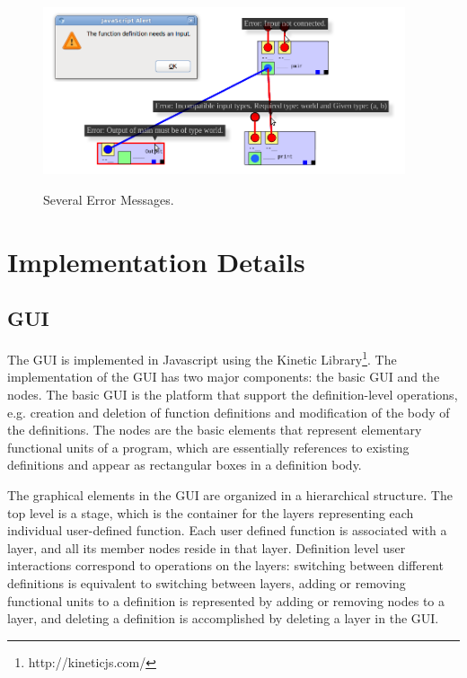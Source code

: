 \documentclass[12pt,UTF8,a4]{article}
\begin{document}
\begin{figure}[h!]
\center
\includegraphics[width=0.95\textwidth]{./images/error_displays_cropped.png} \\
\caption{Several Error Messages.}\label{fig:errors}
\end{figure}

\section{Implementation Details}
\subsection{GUI}
The GUI is implemented in Javascript using the Kinetic Library\footnote{http://kineticjs.com/}. The implementation of the GUI has two major components: the basic GUI and the nodes. The basic GUI is the platform that support the definition-level operations, e.g. creation and deletion of function definitions and modification of the body of the definitions. The nodes are the basic elements that represent elementary functional units of a program, which are essentially references to existing definitions and appear as rectangular boxes in a definition body. 

The graphical elements in the GUI are organized in a hierarchical structure. The top level is a stage, which is the container for the layers representing each individual user-defined function. Each user defined function is associated with a layer, and all its member nodes reside in that layer. Definition level user interactions correspond to operations on the layers: switching between different definitions is equivalent to switching between layers, adding or removing functional units to a definition is represented by adding or removing nodes to a layer, and deleting a definition is accomplished by deleting a layer in the GUI.
\end{document}
